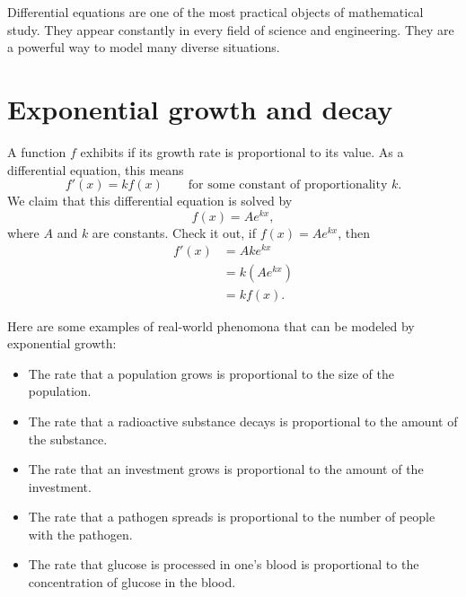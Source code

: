 \documentclass{ximera}
\begin{document}
Differential equations are one of the most practical objects of
mathematical study.  They appear constantly in every field of science
and engineering.  They are a powerful way to model many diverse
situations.



\section{Exponential growth and decay}

A function $f$ exhibits  if its growth rate is
proportional to its value. As a differential equation, this means
\[
f'(x) = k f(x)\qquad\text{for some constant of proportionality $k$.}
\]
We claim that this differential equation is solved by
\[
f(x) = Ae^{kx},
\]
where $A$ and $k$ are constants.  Check it out, if $f(x) = Ae^{kx}$,
then
\begin{align*}
f'(x) &= Ak e^{kx}\\
&= k\left(Ae^{kx} \right)\\
&= k f(x).
\end{align*}

Here are some examples of real-world phenomona that can be modeled by exponential
growth:
\begin{itemize}
  \item The rate that a population grows is proportional to the size
    of the population.
  \item The rate that a radioactive substance decays is proportional
    to the amount of the substance.
  \item The rate that an investment grows is proportional to the
    amount of the investment.
  \item The rate that a pathogen spreads is proportional to the number
    of people with the pathogen.
  \item The rate that glucose is processed in one's blood is
    proportional to the concentration of glucose in the blood.
\end{itemize}
\end{document}
